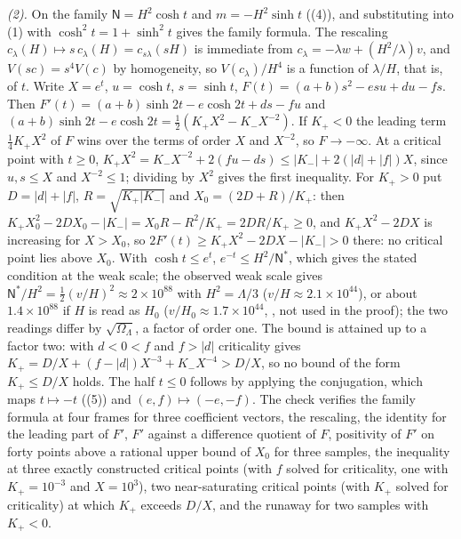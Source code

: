 \emph{(2).} On the family $\mathsf{N} = H^{2}\cosh t$ and $m = -H^{2}\sinh t$ ((4)), and substituting into (1) with $\cosh^{2}t = 1 + \sinh^{2}t$ gives the family formula. The rescaling $c_{\lambda}(H) \mapsto s\,c_{\lambda}(H) = c_{s\lambda}(sH)$ is immediate from $c_{\lambda} = -\lambda w + (H^{2}/\lambda)v$, and $V(sc) = s^{4}V(c)$ by homogeneity, so $V(c_{\lambda})/H^{4}$ is a function of $\lambda/H$, that is, of $t$. Write $X = e^{t}$, $u = \cosh t$, $s = \sinh t$, $F(t) = (a + b)s^{2} - esu + du - fs$. Then $F'(t) = (a + b)\sinh 2t - e\cosh 2t + ds - fu$ and $(a + b)\sinh 2t - e\cosh 2t = \tfrac12(K_{+}X^{2} - K_{-}X^{-2})$. If $K_{+} < 0$ the leading term $\tfrac14 K_{+}X^{2}$ of $F$ wins over the terms of order $X$ and $X^{-2}$, so $F \to -\infty$. At a critical point with $t \ge 0$, $K_{+}X^{2} = K_{-}X^{-2} + 2(fu - ds) \le |K_{-}| + 2(|d| + |f|)X$, since $u, s \le X$ and $X^{-2} \le 1$; dividing by $X^{2}$ gives the first inequality. For $K_{+} > 0$ put $D = |d| + |f|$, $R = \sqrt{K_{+}|K_{-}|}$ and $X_{0} = (2D + R)/K_{+}$: then $K_{+}X_{0}^{2} - 2DX_{0} - |K_{-}| = X_{0}R - R^{2}/K_{+} = 2DR/K_{+} \ge 0$, and $K_{+}X^{2} - 2DX$ is increasing for $X > X_{0}$, so $2F'(t) \ge K_{+}X^{2} - 2DX - |K_{-}| > 0$ there: no critical point lies above $X_{0}$. With $\cosh t \le e^{t}$, $e^{-t} \le H^{2}/\mathsf{N}^{*}$, which gives the stated condition at the weak scale; the observed weak scale gives $\mathsf{N}^{*}/H^{2} = \tfrac12(v/H)^{2} \approx 2 \times 10^{88}$ with $H^{2} = \Lambda/3$ ($v/H \approx 2.1 \times 10^{44}$), or about $1.4 \times 10^{88}$ if $H$ is read as $H_{0}$ ($v/H_{0} \approx 1.7 \times 10^{44}$, , not used in the proof); the two readings differ by $\sqrt{\Omega_{\Lambda}}$, a factor of order one. The bound is attained up to a factor two: with $d < 0 < f$ and $f > |d|$ criticality gives $K_{+} = D/X + (f - |d|)X^{-3} + K_{-}X^{-4} > D/X$, so no bound of the form $K_{+} \le D/X$ holds. The half $t \le 0$ follows by applying the conjugation, which maps $t \mapsto -t$ ((5)) and $(e, f) \mapsto (-e, -f)$. The check verifies the family formula at four frames for three coefficient vectors, the rescaling, the identity for the leading part of $F'$, $F'$ against a difference quotient of $F$, positivity of $F'$ on forty points above a rational upper bound of $X_{0}$ for three samples, the inequality at three exactly constructed critical points (with $f$ solved for criticality, one with $K_{+} = 10^{-3}$ and $X = 10^{3}$), two near-saturating critical points (with $K_{+}$ solved for criticality) at which $K_{+}$ exceeds $D/X$, and the runaway for two samples with $K_{+} < 0$.


